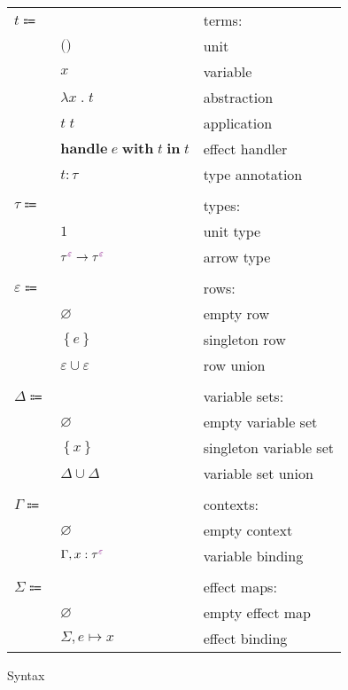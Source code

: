\documentclass[12pt]{article}
\newcommand\anno[2]{#1 : #2}
\newcommand\term{t}
\newcommand\eUnit{\texttt{()}}
\newcommand\eVar{x}
\newcommand\eAbs[2]{\lambda #1 \; . \; #2}
\newcommand\eApp[2]{#1 \; #2}
\newcommand\eHandle[3]{\textbf{handle} \; #1 \; \textbf{with} \; #2 \; \textbf{in} \; #3}
\newcommand\eAnno[2]{\anno{#1}{#2}}
\newcommand\type{\tau}
\newcommand\tUnit{1}
\newcommand\tArrow[4]{\tEmbellished{#1}{#2} \rightarrow \tEmbellished{#3}{#4}}
\newcommand\tEmbellished[2]{{#1}^{\textcolor{violet}{#2}}}
\newcommand\row{\varepsilon}
\newcommand\rEmpty{\varnothing}
\newcommand\rSingleton[1]{\left\{ #1 \right\}}
\newcommand\rUnion[2]{#1 \cup #2}
\newcommand\varSet{\Delta}
\newcommand\vsSingleton[1]{\left\{ #1 \right\}}
\newcommand\vsEmpty{\varnothing}
\newcommand\vsUnion[2]{#1 \cup #2}
\newcommand\context{\Gamma}
\newcommand\cEmpty{\varnothing}
\newcommand\cExtend[4]{#1, \anno{#2}{\tEmbellished{#3}{#4}}}
\newcommand\effect{e}
\newcommand\effectMap{\Sigma}
\newcommand\emMap[2]{#1 \mapsto #2}
\newcommand\emEmpty{\varnothing}
\newcommand\emExtend[3]{#1, \emMap{#2}{#3}}
\begin{document}
      \begin{figure}[H]
        \begin{mdframed}[backgroundcolor=none]
          \begin{center}
            \begin{tabular}{l l l}
              $\term \Coloneqq$ & & terms: \\
              & $\eUnit$ & unit \\
              & $\eVar$ & variable \\
              & $\eAbs{\eVar}{\term}$ & abstraction \\
              & $\eApp{\term}{\term}$ & application \\
              & $\eHandle{\effect}{\term}{\term}$ & effect handler \\
              & $\eAnno{\term}{\type}$ & type annotation \\
              \\
              $\type \Coloneqq$ & & types: \\
              & $\tUnit$ & unit type \\
              & $\tArrow{\type}{\row}{\type}{\row}$ & arrow type \\
              \\
              $\row \Coloneqq$ & & rows: \\
              & $\rEmpty$ & empty row \\
              & $\rSingleton{\effect}$ & singleton row \\
              & $\rUnion{\row}{\row}$ & row union \\
              \\
              $\varSet \Coloneqq$ & & variable sets: \\
              & $\vsEmpty$ & empty variable set \\
              & $\vsSingleton{\eVar}$ & singleton variable set \\
              & $\vsUnion{\varSet}{\varSet}$ & variable set union \\
              \\
              $\context \Coloneqq$ & & contexts: \\
              & $\cEmpty$ & empty context \\
              & $\cExtend{\context}{\eVar}{\type}{\row}$ & variable binding \\
              \\
              $\effectMap \Coloneqq$ & & effect maps: \\
              & $\emEmpty$ & empty effect map \\
              & $\emExtend{\effectMap}{\effect}{\eVar}$ & effect binding \\
            \end{tabular}
          \end{center}

          \caption{Syntax}\label{fig:syntax}
        \end{mdframed}
      \end{figure}
\end{document}
